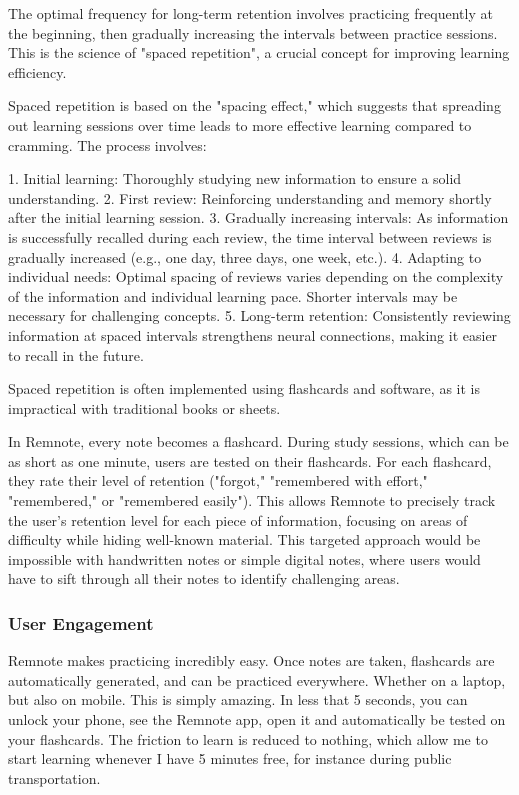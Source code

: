 \documentclass{article}
\begin{document}
The optimal frequency for long-term retention involves practicing
frequently at the beginning, then gradually increasing the intervals
between practice sessions. This is the science of "spaced repetition",
a crucial concept for improving learning efficiency.

Spaced repetition is based on the "spacing effect," which suggests
that spreading out learning sessions over time leads to more
effective learning compared to cramming. The process involves:

1. Initial learning: Thoroughly studying new information to ensure a solid understanding.
2. First review: Reinforcing understanding and memory shortly after the initial learning session.
3. Gradually increasing intervals: As information is successfully recalled during each review, the time interval between reviews is gradually increased (e.g., one day, three days, one week, etc.).
4. Adapting to individual needs: Optimal spacing of reviews varies depending on the complexity of the information and individual learning pace. Shorter intervals may be necessary for challenging concepts.
5. Long-term retention: Consistently reviewing information at spaced intervals strengthens neural connections, making it easier to recall in the future.

Spaced repetition is often implemented using flashcards and
software, as it is impractical with traditional books or sheets.

In Remnote, every note becomes a flashcard. During study sessions,
which can be as short as one minute, users are tested on their flashcards.
For each flashcard, they rate their level of retention
("forgot," "remembered with effort," "remembered," or "remembered easily").
This allows Remnote to precisely track the user's retention level
for each piece of information, focusing on areas of difficulty
while hiding well-known material. This targeted approach would be
impossible with handwritten notes or simple digital notes, where
users would have to sift through all their notes to identify challenging
areas.



\subsubsection{User Engagement}

Remnote makes practicing incredibly easy. Once notes are taken, flashcards
are automatically generated, and can be practiced everywhere.
Whether on a laptop, but also on mobile. This is simply amazing.
In less that 5 seconds, you can unlock your phone, see the Remnote app,
open it and automatically be tested on your flashcards.
The friction to learn is reduced to nothing, which allow me to start
learning whenever I have 5 minutes free, for instance during public
transportation.
\end{document}
